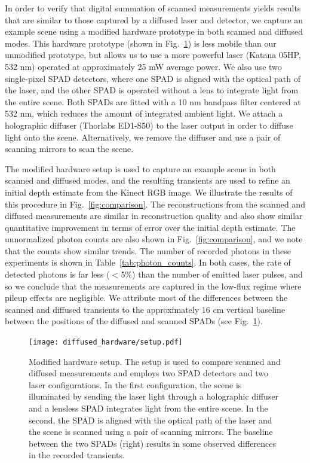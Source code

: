 \documentclass[runningheads]{llncs}
\begin{document}
In order to verify that digital summation of scanned measurements yields results
that are similar to those captured by a diffused laser and detector, we capture
an example scene using a modified hardware prototype in both scanned and
diffused modes. This hardware prototype (shown in Fig.~\ref{fig:hardware}) is less mobile than 
our unmodified prototype, but allows us to use a more powerful laser (Katana
05HP, 532 nm) operated at approximately 25 mW average power. We also use two
single-pixel SPAD detectors, where one SPAD is aligned with the optical path of
the laser, and the other SPAD is operated without a lens to integrate light
from the entire scene. Both SPADs are fitted with a 10 nm bandpass filter
centered at 532 nm, which reduces the amount of integrated ambient light. We
attach a holographic diffuser (Thorlabs ED1-S50) to the laser output in order
to diffuse light onto the scene. Alternatively, we remove the diffuser and use a
pair of scanning mirrors to scan the scene.

The modified hardware setup is used to capture an example scene in both scanned and
diffused modes, and the resulting transients are used to refine an initial depth
estimate from the Kinect RGB image. We illustrate the results of this procedure
in Fig.~\ref{fig:comparison}. The reconstructions from the scanned and diffused
measurements are similar in reconstruction quality and also show similar
quantitative improvement in terms of error over the initial depth estimate. The
unnormalized photon counts are also shown in Fig.~\ref{fig:comparison}, and we
note that the counts show similar trends. The number of recorded photons in
these experiments is shown in Table~\ref{tab:photon_counts}. In both cases, the
rate of detected photons is far less ($<$5\%) than the number of emitted laser
pulses, and so we conclude that the measurements are captured in the low-flux
regime where pileup effects are negligible. We attribute most of the differences
between the scanned and diffused transients to the approximately 16 cm vertical
baseline between the positions of the diffused and scanned SPADs (see
Fig.~\ref{fig:hardware}).
\begin{figure}[H]
  \centering \texttt{[image: diffused\_hardware/setup.pdf]}
  \caption{Modified hardware setup. The setup is used to compare scanned and
  diffused measurements and employs two SPAD detectors and two laser
  configurations. In the first configuration, the scene is illuminated by
  sending the laser light through a holographic diffuser and a lensless SPAD 
  integrates light from the entire scene. In the second, the SPAD is aligned
  with the optical path of the laser and the scene is scanned using a pair of
  scanning mirrors. The baseline between the two SPADs (right) results in some
  observed differences in the recorded transients.}
  \label{fig:hardware}
\end{figure}
\end{document}
